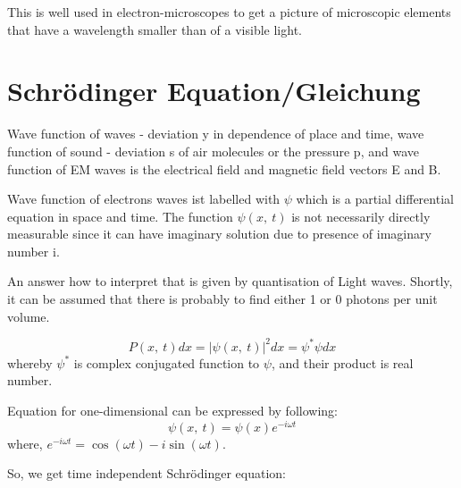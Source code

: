 \documentclass{report}
\begin{document}

This is well used in electron-microscopes to get a picture of microscopic elements that have a wavelength smaller than of a visible light.

\section{Schrödinger Equation/Gleichung}
Wave function of waves - deviation y in dependence of place and time, wave function of sound - deviation s of air molecules or the pressure p, and wave function of EM waves is the electrical field and magnetic field vectors E and B.

Wave function of electrons waves ist labelled with $\psi$ which is a partial differential equation in space and time. 
The function $\psi (x, \ t)$ is not necessarily directly measurable since it can have imaginary solution due to presence of imaginary number i.

An answer how to interpret that is given by quantisation of Light waves. Shortly, it can be assumed that there is probably to find either 1 or 0 photons per unit volume.

\begin{equation}
    P (x, \ t) dx = |\psi (x, \ t) |^2 dx = \psi^{*} \psi dx
\end{equation}
whereby $\psi^*$ is complex conjugated function to $\psi$, and their product is real number.


Equation for one-dimensional can be expressed by following:
\begin{equation}
    \psi (x, \ t) = \psi (x) e^{-i \omega t}
\end{equation}
where, $e^{-i\omega t} = \cos (\omega t) - i\sin (\omega t)$.

So, we get time independent Schrödinger equation:
\end{document}
